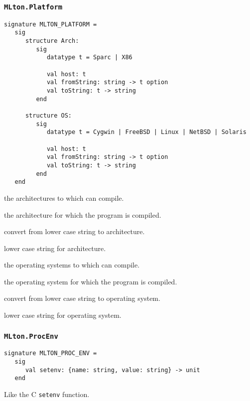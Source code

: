 \subsubsection{\tt MLton.Platform}

\begin{verbatim}
signature MLTON_PLATFORM =
   sig
      structure Arch:
         sig
            datatype t = Sparc | X86

            val host: t
            val fromString: string -> t option
            val toString: t -> string
         end
         
      structure OS:
         sig
            datatype t = Cygwin | FreeBSD | Linux | NetBSD | Solaris

            val host: t
            val fromString: string -> t option
            val toString: t -> string
         end
   end
\end{verbatim}

\begin{description}

the architectures to which {\mlton} can compile.

the architecture for which the program is compiled.

convert from lower case string to architecture.

lower case string for architecture.

the operating systems to which {\mlton} can compile.

the operating system for which the program is compiled.

convert from lower case string to operating system.

lower case string for operating system.

\end{description}
%
\subsubsection{\tt MLton.ProcEnv}

\begin{verbatim}
signature MLTON_PROC_ENV =
   sig
      val setenv: {name: string, value: string} -> unit
   end
\end{verbatim}

\begin{description}
Like the C {\tt setenv} function.
\end{description}
%
